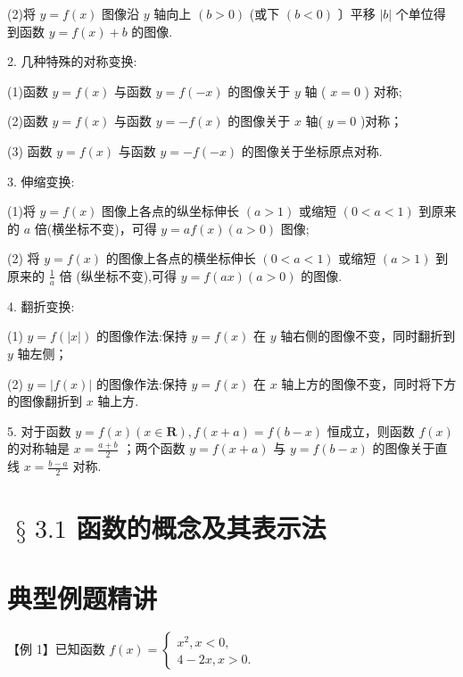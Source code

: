 (2)将 $y = f\left( x\right)$ 图像沿 $y$ 轴向上 $\left( {b > 0}\right)$ (或下 $\left( {b < 0}\right)$ 〕平移 $\left| b\right|$ 个单位得到函数 $y = f\left( x\right)  + b$ 的图像.

2. 几种特殊的对称变换:

(1)函数 $y = f\left( x\right)$ 与函数 $y = f\left( {-x}\right)$ 的图像关于 $y$ 轴 ( $x = 0$ ) 对称;

(2)函数 $y = f\left( x\right)$ 与函数 $y =  - f\left( x\right)$ 的图像关于 $x$ 轴( $y = 0$ )对称；

(3) 函数 $y = f\left( x\right)$ 与函数 $y =  - f\left( {-x}\right)$ 的图像关于坐标原点对称.

3. 伸缩变换:

(1)将 $y = f\left( x\right)$ 图像上各点的纵坐标伸长 $\left( {a > 1}\right)$ 或缩短 $\left( {0 < a < 1}\right)$ 到原来的 $a$ 倍(横坐标不变)，可得 $y  = {af}\left( x\right) \left( {a > 0}\right)$ 图像;

(2) 将 $y = f\left( x\right)$ 的图像上各点的横坐标伸长 $\left( {0 < a < 1}\right)$ 或缩短 $\left( {a > 1}\right)$ 到原来的 $\frac{1}{a}$ 倍 (纵坐标不变),可得 $y = f\left( {ax}\right) \left( {a > 0}\right)$ 的图像.

4. 翻折变换:

(1) $y = f\left( \left| x\right| \right)$ 的图像作法:保持 $y = f\left( x\right)$ 在 $y$ 轴右侧的图像不变，同时翻折到 $y$ 轴左侧；

(2) $y = \left| {f\left( x\right) }\right|$ 的图像作法:保持 $y = f\left( x\right)$ 在 $x$ 轴上方的图像不变，同时将下方的图像翻折到 $x$ 轴上方.

5. 对于函数 $y = f\left( x\right) \left( {x \in  \mathbf{R}}\right) ,f\left( {x + a}\right)  = f\left( {b - x}\right)$ 恒成立，则函数 $f\left( x\right)$ 的对称轴是 $x = \frac{a + b}{2}$ ；两个函数 $y = f\left( {x + a}\right)$ 与 $y = f\left( {b - x}\right)$ 的图像关于直线 $x = \frac{b - a}{2}$ 对称.

\section*{$\text{ § }{3.1}$ 函数的概念及其表示法}

\section*{典型例题精讲}

【例 1】已知函数 $f\left( x\right)  = \left\{  \begin{array}{l} {x}^{2},x < 0, \\  4 - {2x},x > 0. \end{array}\right.$

